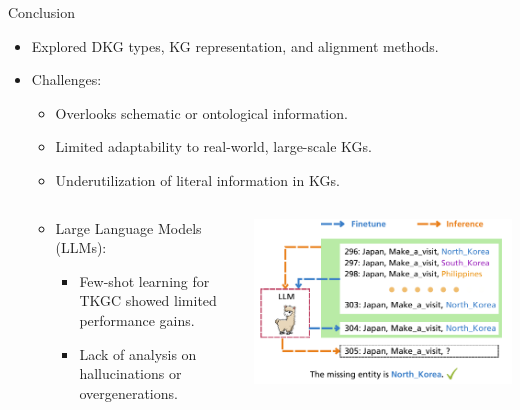 \documentclass{beamer}
\begin{document}
    \begin{frame}{Conclusion}
        \begin{itemize}
            \item Explored DKG types, KG representation, and alignment methods.
            \item Challenges:
            \begin{itemize}
                \item Overlooks schematic or ontological information.
                \item Limited adaptability to real-world, large-scale KGs.
                \item Underutilization of literal information in KGs.
            \end{itemize}
            \begin{columns}
            \begin{column}{0.5\textwidth}
                \begin{itemize}
                    \item Large Language Models (LLMs):
                    \begin{itemize}
                        \item Few-shot learning for TKGC showed limited performance gains.
                        \item Lack of analysis on hallucinations or overgenerations.
                    \end{itemize}
                \end{itemize}
            \end{column}
            \begin{column}{0.5\textwidth}
                \includegraphics[width=\linewidth]{img/LLM.png}
            \end{column}
        \end{columns}
        \end{itemize}
    \end{frame}
\end{document}
